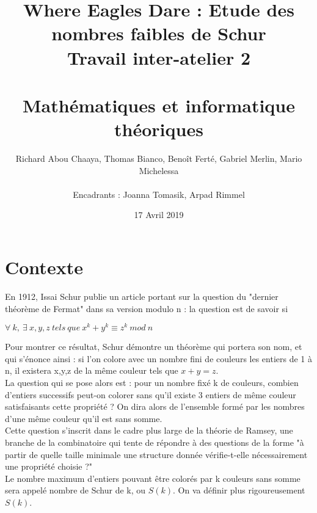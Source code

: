 \documentclass{report}
\title{Where Eagles Dare : Etude des nombres faibles de Schur \\ Travail inter-atelier 2 \\ \\ Mathématiques et informatique théoriques}
\author{Richard Abou Chaaya, Thomas Bianco, Benoît Ferté, Gabriel Merlin, Mario Michelessa \\ \\
Encadrants : Joanna Tomasik, Arpad Rimmel}
\date{17 Avril 2019}
\begin{document}
\renewcommand{\thesection}{\arabic{section}} 



\maketitle

\tableofcontents
\newpage

\section{Contexte}

En 1912, Issai Schur publie un article portant sur la question du "dernier théorème de Fermat" dans sa version modulo n : la question est de savoir si

\begin{center}

$\forall \ k, \ \exists \ x,y,z \ tels \ que \ x^k + y^k \equiv z^k \ mod \ n $

\end{center}

Pour montrer ce résultat, Schur démontre un théorème qui portera son nom, et qui s'énonce ainsi : si l'on colore avec un nombre fini de couleurs les entiers de 1 à n, il existera x,y,z de la même couleur tels que $x + y = z$.
\\
La question qui se pose alors est : pour un nombre fixé k de couleurs, combien d'entiers successifs peut-on colorer sans qu'il existe 3 entiers de même couleur satisfaisants cette propriété ? On dira alors de l'ensemble formé par les nombres d'une même couleur qu'il est sans somme.
\\
Cette question s'inscrit dans le cadre plus large de la théorie de Ramsey, une branche de la combinatoire qui tente de répondre à des questions de la forme "à partir de quelle taille minimale une structure donnée vérifie-t-elle nécessairement une propriété choisie ?"
\\
Le nombre maximum d'entiers pouvant être colorés par k couleurs sans somme sera appelé nombre de Schur de k, ou $S(k)$. On va définir plus rigoureusement $S(k)$.
\end{document}
